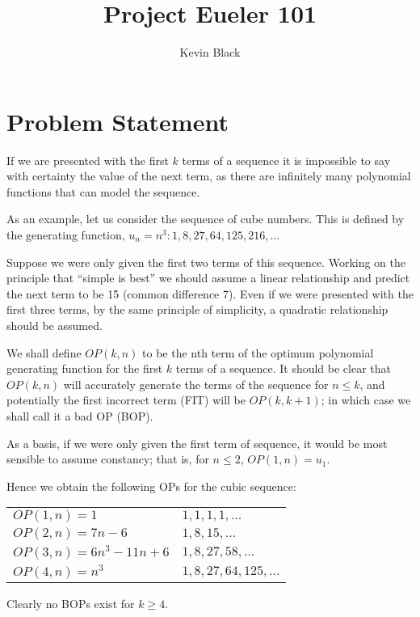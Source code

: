 \documentclass[11pt]{amsart}
\title{\vspace{-1.5cm}Project Eueler 101}
\author{Kevin Black}
\begin{document}
\maketitle

\section{Problem Statement}

If we are presented with the first $k$ terms of a sequence it is impossible to say with certainty the value of the next term, as there are infinitely many polynomial functions that can model the sequence.

As an example, let us consider the sequence of cube numbers. This is defined by the generating function,
$u_n = n^3: 1, 8, 27, 64, 125, 216, ...$

Suppose we were only given the first two terms of this sequence. Working on the principle that ``simple is best'' we should assume a linear relationship and predict the next term to be 15 (common difference 7). Even if we were presented with the first three terms, by the same principle of simplicity, a quadratic relationship should be assumed.

We shall define $OP(k, n)$ to be the nth term of the optimum polynomial generating function for the first $k$ terms of a sequence. It should be clear that $OP(k, n)$ will accurately generate the terms of the sequence for $n \leq k$, and potentially the first incorrect term (FIT) will be $OP(k, k+1)$; in which case we shall call it a bad OP (BOP).

As a basis, if we were only given the first term of sequence, it would be most sensible to assume constancy; that is, for $n \leq 2$, $OP(1, n) = u_1$.

Hence we obtain the following OPs for the cubic sequence: \\

\begin{center}
\begin{tabular}{ll}
$OP(1, n) =1$ &	$1, 1, 1, 1, ...$ \\
$OP(2, n) =7n - 6$ & $1, 8, 15, ...$ \\
$OP(3, n) =6n^3-11n+6$ & $1, 8, 27, 58, ...$ \\
$OP(4, n) =n^3$ & $1, 8, 27, 64, 125, ...$ \\
\end{tabular}
\end{center}

Clearly no BOPs exist for $k \geq 4$.
\end{document}
